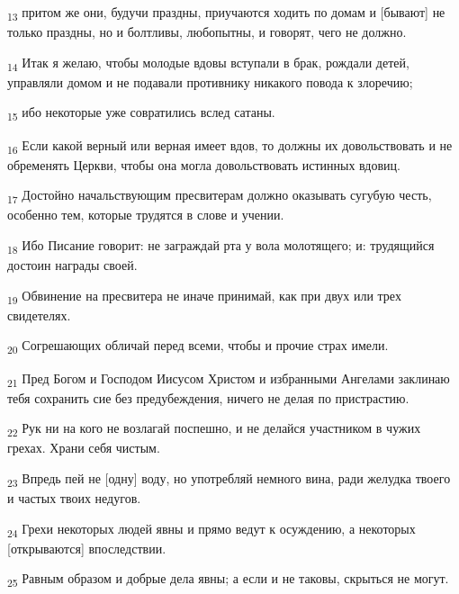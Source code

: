\begin{tcolorbox}
\textsubscript{13} притом же они, будучи праздны, приучаются ходить по домам и [бывают] не только праздны, но и болтливы, любопытны, и говорят, чего не должно.
\end{tcolorbox}
\begin{tcolorbox}
\textsubscript{14} Итак я желаю, чтобы молодые вдовы вступали в брак, рождали детей, управляли домом и не подавали противнику никакого повода к злоречию;
\end{tcolorbox}
\begin{tcolorbox}
\textsubscript{15} ибо некоторые уже совратились вслед сатаны.
\end{tcolorbox}
\begin{tcolorbox}
\textsubscript{16} Если какой верный или верная имеет вдов, то должны их довольствовать и не обременять Церкви, чтобы она могла довольствовать истинных вдовиц.
\end{tcolorbox}
\begin{tcolorbox}
\textsubscript{17} Достойно начальствующим пресвитерам должно оказывать сугубую честь, особенно тем, которые трудятся в слове и учении.
\end{tcolorbox}
\begin{tcolorbox}
\textsubscript{18} Ибо Писание говорит: не заграждай рта у вола молотящего; и: трудящийся достоин награды своей.
\end{tcolorbox}
\begin{tcolorbox}
\textsubscript{19} Обвинение на пресвитера не иначе принимай, как при двух или трех свидетелях.
\end{tcolorbox}
\begin{tcolorbox}
\textsubscript{20} Согрешающих обличай перед всеми, чтобы и прочие страх имели.
\end{tcolorbox}
\begin{tcolorbox}
\textsubscript{21} Пред Богом и Господом Иисусом Христом и избранными Ангелами заклинаю тебя сохранить сие без предубеждения, ничего не делая по пристрастию.
\end{tcolorbox}
\begin{tcolorbox}
\textsubscript{22} Рук ни на кого не возлагай поспешно, и не делайся участником в чужих грехах. Храни себя чистым.
\end{tcolorbox}
\begin{tcolorbox}
\textsubscript{23} Впредь пей не [одну] воду, но употребляй немного вина, ради желудка твоего и частых твоих недугов.
\end{tcolorbox}
\begin{tcolorbox}
\textsubscript{24} Грехи некоторых людей явны и прямо ведут к осуждению, а некоторых [открываются] впоследствии.
\end{tcolorbox}
\begin{tcolorbox}
\textsubscript{25} Равным образом и добрые дела явны; а если и не таковы, скрыться не могут.
\end{tcolorbox}
